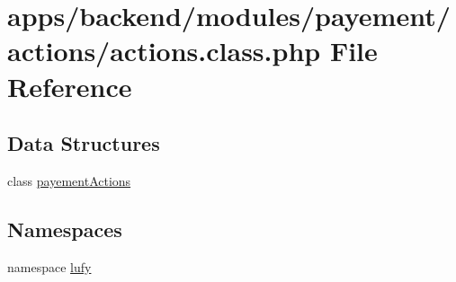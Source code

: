 \hypertarget{backend_2modules_2payement_2actions_2actions_8class_8php}{\section{apps/backend/modules/payement/actions/actions.class.\-php File Reference}
\label{backend_2modules_2payement_2actions_2actions_8class_8php}
}
\subsection*{Data Structures}
\begin{DoxyCompactItemize}
\item 
class \hyperlink{classpayement_actions}{payement\-Actions}
\end{DoxyCompactItemize}
\subsection*{Namespaces}
\begin{DoxyCompactItemize}
\item 
namespace \hyperlink{namespacelufy}{lufy}
\end{DoxyCompactItemize}
